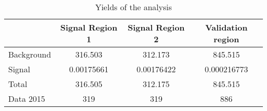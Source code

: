 \documentclass[10pt]{article}
\begin{document}
\begin{table}[htbp]
\begin{center}
\begin{tabular}{|l|S|S|S|}
\hline 
 & {Signal Region 1} & {Signal Region 2} & {Validation region}\\
\hline 
  Background   & 316.503  & 312.173  & 845.515  \\ 
  Signal   & 0.00175661  & 0.00176422  & 0.000216773  \\ 
\hline 
  Total  & 316.505  & 312.175  & 845.515  \\ 
\hline 
  Data 2015   & 319 & 319 & 886 \\ 
\hline 
\end{tabular} 
\caption{Yields of the analysis} 
\end{center} 
\end{table} 
\end{document}
